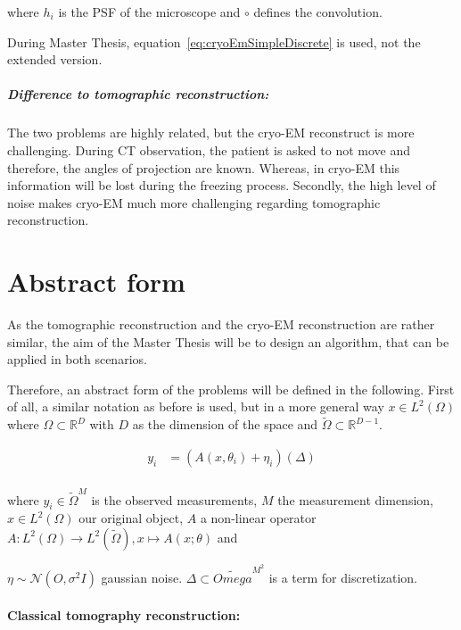where $h_i$ is the PSF of the microscope and $\circ$ defines the convolution.


\begin{tcolorbox}[colback=red!5!white,colframe=red!75!black]
    During Master Thesis, equation~\ref{eq:cryoEmSimpleDiscrete} is used, not the extended version.
\end{tcolorbox}


\subparagraph{Difference to tomographic reconstruction:}
The two problems are highly related, but the cryo-EM reconstruct is more challenging.
During CT observation, the patient is asked to not move and therefore, the angles of projection are known.
Whereas, in cryo-EM this information will be lost during the freezing process.
Secondly, the high level of noise makes cryo-EM much more challenging regarding tomographic reconstruction.


\section{Abstract form}
As the tomographic reconstruction and the cryo-EM reconstruction are rather similar, 
the aim of the Master Thesis will be to design an algorithm, that can be applied in both scenarios.

Therefore, an abstract form of the problems will be defined in the following.
First of all, a similar notation as before is used, but in a more general way
$x \in L^2(\Omega)$ where $\Omega \subset \mathbb{R}^D$ with $D$ as the dimension of the space
and $\tilde{\Omega} \subset \mathbb{R}^{D-1}$.


\begin{equation}
    \begin{aligned}
        y_i &= \left( A(x, \theta_i) + \eta_i \right) (\Delta)\\
    \end{aligned}
\end{equation}

where $y_i \in \tilde{\Omega}^M$ is the observed measurements, $M$ the measurement dimension, $x \in L^2(\Omega)$ our original object, $A$ a non-linear operator 
$A: L^2(\Omega) \to L^2(\tilde{\Omega}), x \mapsto A(x; \theta)$ and

$\eta \sim \mathcal{N}(O, \sigma^2 I)$ gaussian noise. $\Delta \subset \tilde{Omega}^{M^2}$ is a term for discretization.

\paragraph{Classical tomography reconstruction:}

